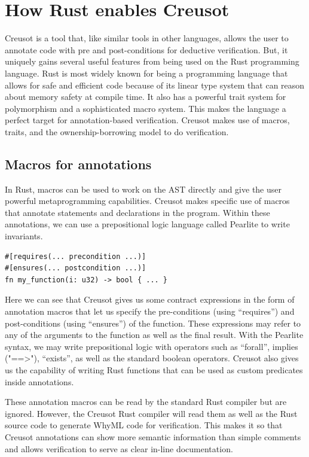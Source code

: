 \documentclass[12pt]{article}
\begin{document}
\section{How Rust enables Creusot}


Creusot is a tool that, like similar tools in other languages, allows the user to annotate code with pre and post-conditions for deductive verification.
But, it uniquely gains several useful features from being used on the Rust programming language.
Rust is most widely known for being a programming language that allows for safe and efficient code because of its linear type system that can reason about memory safety at compile time.
It also has a powerful trait system for polymorphism and a sophisticated macro system.
This makes the language a perfect target for annotation-based verification.
Creusot makes use of macros, traits, and the ownership-borrowing model to do verification.

\subsection{Macros for annotations}
In Rust, macros can be used to work on the AST directly and give the user powerful metaprogramming capabilities.
Creusot makes specific use of macros that annotate statements and declarations in the program.
Within these annotations, we can use a prepositional logic language called Pearlite to write invariants.
\begin{verbatim}
#[requires(... precondition ...)]
#[ensures(... postcondition ...)]
fn my_function(i: u32) -> bool { ... }
\end{verbatim}

Here we can see that Creusot gives us some contract expressions in the form of annotation macros that let us specify the pre-conditions (using ``requires'') and post-conditions (using ``ensures'') of the function.
These expressions may refer to any of the arguments to the function as well as the final result.
With the Pearlite syntax, we may write prepositional logic with operators such as ``forall'', implies ("==>"), ``exists'', as well as the standard boolean operators.
Creusot also gives us the capability of writing Rust functions that can be used as custom predicates inside annotations.

These annotation macros can be read by the standard Rust compiler but are ignored.
However, the Creusot Rust compiler will read them as well as the Rust source code to generate WhyML code for verification.
This makes it so that Creusot annotations can show more semantic information than simple comments and allows verification to serve as clear in-line documentation.
\end{document}
